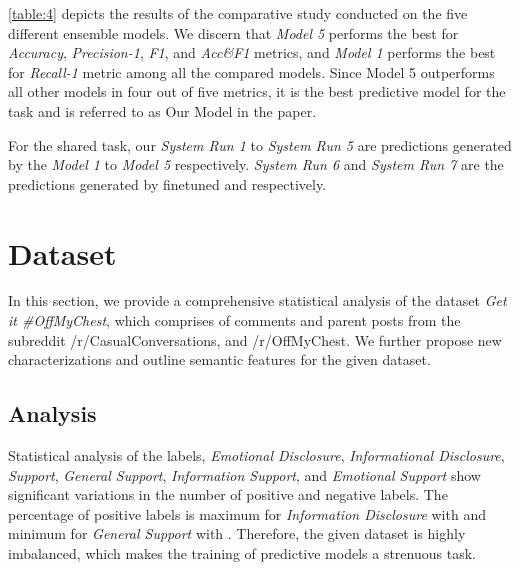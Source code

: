 \documentclass[runningheads]{llncs}
\begin{document}
\autoref{table:4} depicts the results of the comparative study conducted on the five different ensemble models. We discern that \textit{Model 5} performs the best for \textit{Accuracy}, \textit{Precision-1}, \textit{F1}, and \textit{Acc\&F1} metrics, and \textit{Model 1} performs the best for \textit{Recall-1} metric among all the compared models. Since Model 5 outperforms all other models in four out of five metrics, it is the best predictive model for the task and is referred to as Our Model in the paper.

For the shared task, our \textit{System Run 1} to \textit{System Run 5} are predictions generated by the \textit{Model 1} to \textit{Model 5} respectively. \textit{System Run 6} and \textit{System Run 7} are the predictions generated by finetuned  and  respectively.


\section{Dataset}
In this section, we provide a comprehensive statistical analysis of the dataset \textit{Get it \#OffMyChest}, which comprises of comments and parent posts from the subreddit /r/CasualConversations, and /r/OffMyChest. We further propose new characterizations and outline semantic features for the given dataset. 

\subsection{Analysis}
Statistical analysis of the labels, \textit{Emotional Disclosure}, \textit{Informational Disclosure}, \textit{Support}, \textit{General Support}, \textit{Information Support}, and \textit{Emotional Support} show significant variations in the number of positive and negative labels. The percentage of positive labels is maximum for \textit{Information Disclosure} with  and minimum for \textit{General Support} with . Therefore, the given dataset is highly imbalanced, which makes the training of predictive models a strenuous task.
\end{document}
